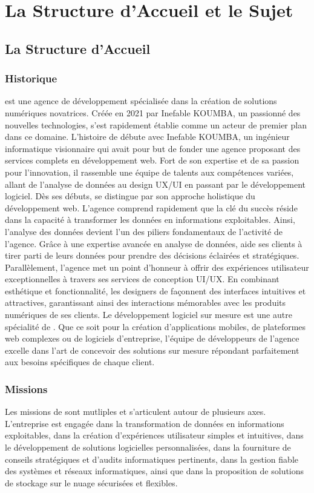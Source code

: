 \chapter{La Structure d’Accueil et le Sujet}
\section{La Structure d’Accueil}
\subsection{Historique}

\mazf est une agence de développement spécialisée dans la création de solutions
numériques novatrices. Créée en 2021 par Inefable KOUMBA, un passionné des nouvelles
technologies, \mazf s'est rapidement établie comme un acteur de premier plan dans ce domaine.
L'histoire de \mazf débute avec Inefable KOUMBA, un ingénieur informatique
visionnaire qui avait pour but de fonder une agence proposant des services complets
en développement web. Fort de son expertise et de sa passion pour l’innovation,
il rassemble une équipe de talents aux compétences variées, allant de l’analyse
de données au design UX/UI en passant par le développement logiciel.
Dès ses débuts, \mazf se distingue par son approche holistique du développement
web. L’agence comprend rapidement que la clé du succès réside dans la capacité à
transformer les données en informations exploitables. Ainsi, l’analyse des données
devient l’un des piliers fondamentaux de l’activité de l’agence. Grâce à une
expertise avancée en analyse de données, \mazf aide ses clients à tirer
parti de leurs données pour prendre des décisions éclairées et stratégiques.
Parallèlement, l’agence met un point d’honneur à offrir des expériences utilisateur
exceptionnelles à travers ses services de conception UI/UX. En combinant esthétique
et fonctionnalité, les designers de \mazf façonnent des interfaces intuitives
et attractives, garantissant ainsi des interactions mémorables avec les produits
numériques de ses clients. Le développement logiciel sur mesure est une autre
spécialité de \mazf. Que ce soit pour la création d’applications mobiles,
de plateformes web complexes ou de logiciels d’entreprise, l’équipe de développeurs
de l’agence excelle dans l’art de concevoir des solutions sur mesure répondant
parfaitement aux besoins spécifiques de chaque client.

\subsection{Missions}
Les missions de \firm sont mutliples et s’articulent autour de plusieurs axes. L’entreprise
est engagée dans la transformation de données en informations exploitables, dans
la création d’expériences utilisateur simples et intuitives, dans le développement de solutions
logicielles personnalisées, dans la fourniture de conseils stratégiques et d’audits
informatiques pertinents, dans la gestion fiable des systèmes et réseaux informatiques,
ainsi que dans la proposition de solutions de stockage sur le nuage sécurisées et flexibles.

